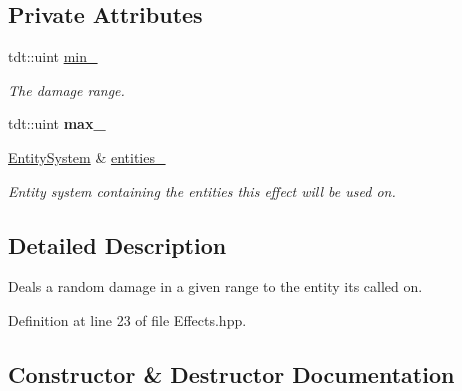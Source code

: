 \subsection*{Private Attributes}
\begin{DoxyCompactItemize}
\item 
tdt\+::uint \hyperlink{structutil_1_1effect_1_1_d_a_m_a_g_e___e_f_f_e_c_t_a294eef54f03197f6f26ea538daa84310}{min\+\_\+}
\begin{DoxyCompactList}\small\item\em The damage range. \end{DoxyCompactList}\item 
tdt\+::uint {\bfseries max\+\_\+}\hypertarget{structutil_1_1effect_1_1_d_a_m_a_g_e___e_f_f_e_c_t_af092bc692b6b81858e1ab984bf012f06}{}\label{structutil_1_1effect_1_1_d_a_m_a_g_e___e_f_f_e_c_t_af092bc692b6b81858e1ab984bf012f06}

\item 
\hyperlink{class_entity_system}{Entity\+System} \& \hyperlink{structutil_1_1effect_1_1_d_a_m_a_g_e___e_f_f_e_c_t_a4d2debfb657c6ee88950e249fe947087}{entities\+\_\+}
\begin{DoxyCompactList}\small\item\em Entity system containing the entities this effect will be used on. \end{DoxyCompactList}\end{DoxyCompactItemize}


\subsection{Detailed Description}
Deals a random damage in a given range to the entity it\textquotesingle{}s called on. 

Definition at line 23 of file Effects.\+hpp.



\subsection{Constructor \& Destructor Documentation}
